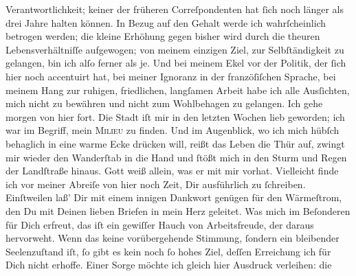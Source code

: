 \begin{ledgroupsized}[t]{13cm}
               Verantwortlichkeit; keiner der früheren Correſpondenten {\pb}hat ſich noch länger als drei Jahre halten können.
               In Bezug auf den Gehalt werde ich wahrſcheinlich betrogen werden; die kleine Erhöhung
               gegen bisher wird durch die theuren Lebensverhältniſſe aufgewogen; von meinem
               einzigen Ziel, zur Selbſtändigkeit zu  gelangen, bin ich alſo ferner als je. Und bei meinem Ekel vor der Politik, der
               ſich hier noch  accentuirt hat, bei meiner Ignoranz
               in der franzöſiſchen Sprache, bei meinem Hang zur ruhigen, \strikeout{\textcolor{gray}{ſt}} friedlichen, langſamen Arbeit habe ich alle Ausſichten, mich nicht zu bewähren
               und nicht zum Wohlbehagen zu gelangen. Ich gehe morgen
               von hier fort. Die Stadt iſt
               mir in den letzten Wochen lieb geworden; ich war im Begriff, mein \textsc{Milieu} zu finden. Und im Augenblick, wo ich mich hübſch
               behaglich in eine warme Ecke drücken will, {\pb} reißt das Leben die Thür auf, zwingt mir wieder
               den Wanderſtab  in die Hand und ſtößt mich in
               den Sturm und Regen der Landſtraße hinaus. Gott weiß allein, was er mit mir
               vorhat.\pend
           \pstart
           Vielleicht finde ich vor meiner Abreiſe von hier noch Zeit, Dir ausführlich zu
               ſchreiben. Einſtweilen laß’ Dir mit einem innigen Dankwort genügen für den
               Wärmeſtrom, den Du mit Deinen lieben Briefen in mein Herz geleitet. Was mich im
               Beſonderen für Dich erfreut, das iſt ein gewiſſer Hauch von Arbeitsfreude, der daraus
               hervorweht. Wenn das keine vorübergehende Stimmung, ſondern ein bleibender
               Seelenzuſtand iſt, ſo gibt es kein noch ſo hohes Ziel, deſſen Erreichung ich für Dich
               nicht erhoffe. Einer Sorge möchte ich gleich hier Ausdruck verleihen:  die \label{K_L02670-1v}
\end{ledgroupsized}
